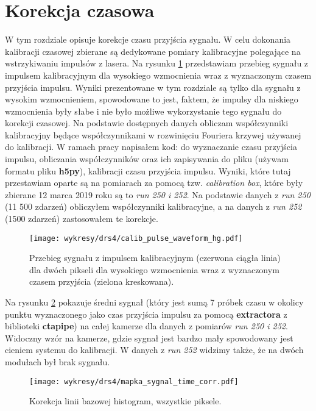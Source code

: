 \documentclass[a4paper,11pt,twoside]{article}
\begin{document}
\section{Korekcja czasowa}
W tym rozdziale opisuje korekcje czasu przyjścia sygnału. 
W celu dokonania kalibracji czasowej zbierane są dedykowane pomiary kalibracyjne polegające na wstrzykiwaniu impulsów z lasera. Na rysunku \ref{fig:calib_waveform_hg} przedstawiam przebieg sygnału z impulsem kalibracyjnym dla wysokiego wzmocnienia wraz z wyznaczonym czasem przyjścia impulsu. Wyniki prezentowane w tym rozdziale są tylko dla sygnału z wysokim wzmocnieniem, spowodowane to jest, faktem, że impulsy dla niskiego wzmocnienia były słabe i nie było możliwe wykorzystanie tego sygnału do korekcji czasowej.  Na podstawie dostępnych danych obliczam współczynniki kalibracyjny będące współczynnikami w rozwinięciu Fouriera krzywej używanej do kalibracji. W ramach pracy napisałem kod: do wyznaczanie czasu przyjścia impulsu, obliczania współczynników oraz ich zapisywania do pliku (używam formatu pliku {\bf{h5py}}), kalibracji czasu przyjścia impulsu. Wyniki, które tutaj przestawiam oparte są na pomiarach za pomocą tzw. \textsl{calibration box}, które były zbierane 12 marca 2019 roku są to \textsl{run 250 i 252}. Na podstawie danych z \textsl{run 250} (11 500 zdarzeń) obliczyłem współczynniki kalibracyjne, a na danych z \textsl{run 252} (1500 zdarzeń) zastosowałem te korekcje. 
\begin{figure}[H] 
\centering
\texttt{[image: wykresy/drs4/calib\_pulse\_waveform\_hg.pdf]}
\caption{Przebieg sygnału z impulsem kalibracyjnym (czerwona ciągła linia) dla dwóch pikseli dla wysokiego wzmocnienia wraz z wyznaczonym czasem przyjścia (zielona kreskowana).}
\label{fig:calib_waveform_hg}
\end{figure}
Na rysunku \ref{fig:signal_map} pokazuje średni sygnał (który jest sumą 7 próbek czasu w okolicy punktu wyznaczonego jako czas przyjścia impulsu za pomocą {\bf{extractora}} z biblioteki {\bf{ctapipe}}) na całej kamerze dla danych z pomiarów \textsl{run 250 i 252}. Widoczny wzór na kamerze, gdzie sygnał jest bardzo mały spowodowany jest cieniem systemu do kalibracji. W danych z \textsl{run 252} widzimy także, że na dwóch modułach był brak sygnału.
\begin{figure}[H] 
\centering
\texttt{[image: wykresy/drs4/mapka\_sygnal\_time\_corr.pdf]}
\caption{Korekcja linii bazowej histogram, wszystkie piksele.}
\label{fig:signal_map}
\end{figure}
\end{document}
